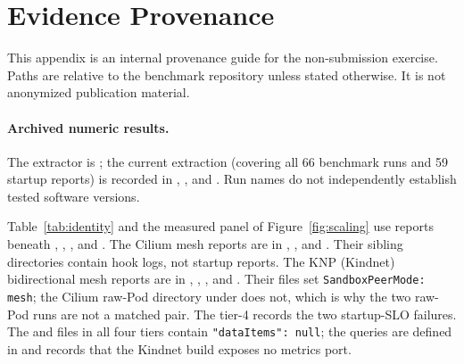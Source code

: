 \documentclass[letterpaper,twocolumn,10pt]{article}
\newcommand{\sys}{\textsc{KNP}}
\begin{document}
\clearpage



\clearpage
\appendix
\section{Evidence Provenance}
\label{sec:provenance}
This appendix is an internal provenance guide for the non-submission
exercise. Paths are relative to the benchmark repository unless
stated otherwise. It is not anonymized publication material.

\paragraph{Archived numeric results.}
The extractor is ; the current extraction
(covering all 66 benchmark runs and 59 startup reports) is recorded in
,
, and
. Run names do not
independently establish tested software versions.

Table~\ref{tab:identity} and the measured panel of
Figure~\ref{fig:scaling} use reports beneath
,
,
, and
. The Cilium mesh reports are in
,
, and
. Their sibling
 directories contain hook logs, not startup reports.
The \sys{} (Kindnet) bidirectional mesh reports are in
,
,
, and
. Their
 files set
\texttt{SandboxPeerMode: mesh}; the Cilium raw-Pod directory under
 does not, which is why the two raw-Pod runs
are not a matched pair. The tier-4  records the two
startup-SLO failures. The  and  files in
all four tiers contain \texttt{"dataItems": null}; the queries are
defined in 
and  records that the Kindnet
build exposes no metrics port.
\end{document}
